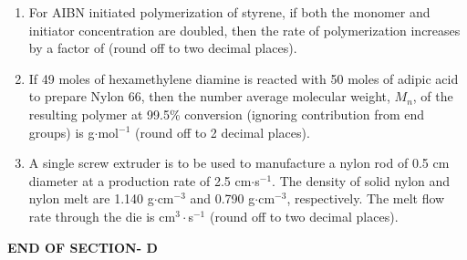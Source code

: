 \documentclass[journal,12pt,onecolumn]{IEEEtran}
\begin{document}
\begin{enumerate}[label=\arabic*)]
\item For AIBN initiated polymerization of styrene, if both the monomer and initiator concentration are doubled, then the rate of polymerization increases by a factor of \underline{\hspace{2cm}} (round off to two decimal places).
\hfill{} \\

\vspace{0.5cm}

\item If 49 moles of hexamethylene diamine is reacted with 50 moles of adipic acid to prepare Nylon 66, then the number average molecular weight, $M_{n}$, of the resulting polymer at 99.5\% conversion (ignoring contribution from end groups) is \underline{\hspace{2cm}} g$\cdot$mol$^{-1}$ (round off to 2 decimal places).
\vspace{0.05cm}
\hfill{} \\

\vspace{0.5cm}

\item A single screw extruder is to be used to manufacture a nylon rod of 0.5 cm diameter at a production rate of 2.5 cm$\cdot$s$^{-1}$. The density of solid nylon and nylon melt are 1.140 g$\cdot$cm$^{-3}$ and 0.790 g$\cdot$cm$^{-3}$, respectively. The melt flow rate through the die is \underline{\hspace{2cm}} cm$^{3}\cdot$s$^{-1}$ (round off to two decimal places).
\hfill{} \\

\vspace{0.5cm}

\end{enumerate}

\vspace{3\baselineskip}
\begin{center}
    \item[\textbf{END OF SECTION- D}]
\end{center}


\newpage
\end{document}
